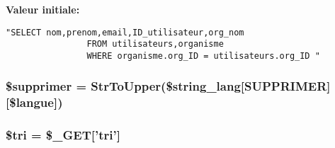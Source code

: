 {\bf Valeur initiale:}

\footnotesize\begin{verbatim}"SELECT nom,prenom,email,ID_utilisateur,org_nom
                FROM utilisateurs,organisme
                WHERE organisme.org_ID = utilisateurs.org_ID "
\end{verbatim}\normalsize 
\hypertarget{utilisateurs__liste_8php_a3}{
\subsubsection[\$supprimer]{\setlength{\rightskip}{0pt plus 5cm}\$supprimer = Str\-To\-Upper(\$string\_\-lang\mbox{[}SUPPRIMER\mbox{]}\mbox{[}\$langue\mbox{]})}}
\label{utilisateurs__liste_8php_a3}


\hypertarget{utilisateurs__liste_8php_a5}{
\subsubsection[\$tri]{\setlength{\rightskip}{0pt plus 5cm}\$tri = \$\_\-GET\mbox{[}'tri'\mbox{]}}}
\label{utilisateurs__liste_8php_a5}


